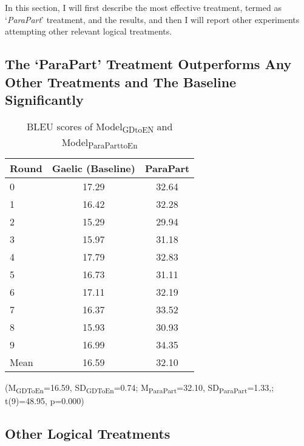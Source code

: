 \documentclass[a4paper]{article}
\begin{document}
In this section, I will first describe the most effective  treatment, termed as `\textit{ParaPart}' treatment, and the results, and then I will report other experiments attempting other relevant logical treatments. 

\subsection{The `ParaPart' Treatment Outperforms Any Other Treatments and The Baseline Significantly}
\begin{table}[ht]
\centering
\begin{tabular}{lcc}
  \hline
Round & Gaelic (Baseline) & ParaPart \\ 
  \hline
0 & 17.29 & 32.64 \\ 
  1 & 16.42 & 32.28 \\ 
  2 & 15.29 & 29.94 \\ 
  3 & 15.97 & 31.18 \\ 
  4 & 17.79 & 32.83 \\ 
  5 & 16.73 & 31.11 \\ 
  6 & 17.11 & 32.19 \\ 
  7 & 16.37 & 33.52 \\ 
  8 & 15.93 & 30.93 \\ 
  9 & 16.99 & 34.35 \\ 
   \hline
Mean & 16.59 & 32.10 \\ 
   \hline
\end{tabular}
\caption{BLEU scores of Model\textsubscript{GDtoEN} and Model\textsubscript{ParaParttoEn}} 
\label{Table:ParaPart}
\end{table}(M\textsubscript{GDToEn}=16.59, SD\textsubscript{GDToEn}=0.74; M\textsubscript{ParaPart}=32.10, SD\textsubscript{ParaPart}=1.33,; t(9)=48.95, p=0.000)

\subsection{Other Logical Treatments}
\end{document}
